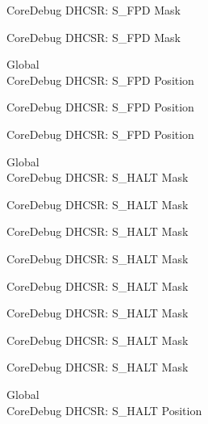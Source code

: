 \begin{DoxyRefList}
\label{deprecated__deprecated000465}%
%
Core\+Debug DHCSR\+: S\+\_\+\+FPD Mask 

\label{deprecated__deprecated000567}%
%
Core\+Debug DHCSR\+: S\+\_\+\+FPD Mask  
\item[Global \doxylink{group___c_m_s_i_s___s_c_b_ga620b141720c475f5bde4138855c6ed83}{Core\+Debug\+\_\+\+DHCSR\+\_\+\+S\+\_\+\+FPD\+\_\+\+Pos} ]\hfill \\
\label{deprecated__deprecated000013}%
%
Core\+Debug DHCSR\+: S\+\_\+\+FPD Position 

\label{deprecated__deprecated000464}%
%
Core\+Debug DHCSR\+: S\+\_\+\+FPD Position 

\label{deprecated__deprecated000566}%
%
Core\+Debug DHCSR\+: S\+\_\+\+FPD Position  
\item[Global \doxylink{group___c_m_s_i_s___core_debug_ga9f881ade3151a73bc5b02b73fe6473ca}{Core\+Debug\+\_\+\+DHCSR\+\_\+\+S\+\_\+\+HALT\+\_\+\+Msk} ]\hfill \\
\label{deprecated__deprecated000026}%
%
Core\+Debug DHCSR\+: S\+\_\+\+HALT Mask 

\label{deprecated__deprecated000118}%
%
Core\+Debug DHCSR\+: S\+\_\+\+HALT Mask 

\label{deprecated__deprecated000172}%
%
Core\+Debug DHCSR\+: S\+\_\+\+HALT Mask 

\label{deprecated__deprecated000257}%
%
Core\+Debug DHCSR\+: S\+\_\+\+HALT Mask 

\label{deprecated__deprecated000314}%
%
Core\+Debug DHCSR\+: S\+\_\+\+HALT Mask 

\label{deprecated__deprecated000390}%
%
Core\+Debug DHCSR\+: S\+\_\+\+HALT Mask 

\label{deprecated__deprecated000477}%
%
Core\+Debug DHCSR\+: S\+\_\+\+HALT Mask 

\label{deprecated__deprecated000579}%
%
Core\+Debug DHCSR\+: S\+\_\+\+HALT Mask  
\item[Global \doxylink{group___c_m_s_i_s___core_debug_ga760a9a0d7f39951dc3f07d01f1f64772}{Core\+Debug\+\_\+\+DHCSR\+\_\+\+S\+\_\+\+HALT\+\_\+\+Pos} ]\hfill \\
\label{deprecated__deprecated000025}%
%
Core\+Debug DHCSR\+: S\+\_\+\+HALT Position 


\end{DoxyRefList}
